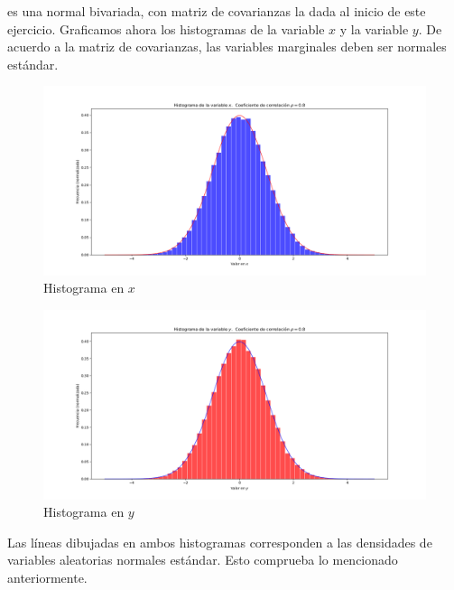 \documentclass[letterpaper]{article}
\newcommand{\1}{\mathds{1}}
\theoremstyle{definition}
\theoremstyle{definition}
\theoremstyle{definition}
\theoremstyle{definition}
\theoremstyle{definition}
\begin{document}
\begin{itemize}
    es una normal bivariada, con matriz de covarianzas la dada al inicio de este ejercicio.  Graficamos ahora 
    los histogramas de la variable $x$ y la variable $y$. De acuerdo a la matriz de covarianzas,
    las variables marginales deben ser normales estándar.
    \begin{figure}[h!]
        \centering
        \includegraphics[width=\linewidth]{3.png}
        \caption{Histograma en $x$}
    \end{figure} 
    \begin{figure}[h!]
        \centering
        \includegraphics[width=\linewidth]{4.png}
        \caption{Histograma en $y$}
    \end{figure} 
    Las líneas dibujadas en ambos histogramas corresponden a las densidades de variables 
    aleatorias normales estándar. Esto comprueba lo mencionado anteriormente.\\
    

\end{itemize}
\end{document}
